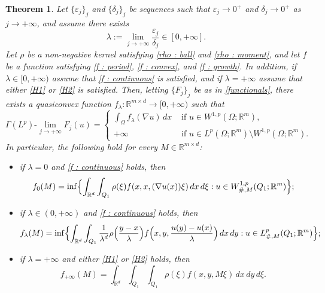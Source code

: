 \documentclass{article}
\newtheorem{theorem}[lemma]{Theorem}
\theoremstyle{definition}
\newcommand{\ej}{\varepsilon_j}
\newcommand{\dej}{\delta_j}
\newcommand{\R}{\mathbb{R}}
\begin{document}
\begin{theorem}\label{thm : main}
    Let $\{\ej\}_j$ and $\{\dej\}_j$ be sequences such that $\ej\to 0^+$ and $\dej\to0^+$ as $j\to+\infty$, and assume there exists
    \begin{equation*}
        \lambda:=\lim_{j\to+\infty}\frac{\ej}{\dej}\in[0,+\infty].
    \end{equation*} Let $\rho$ be a non-negative kernel satisfying \eqref{rho : ball} and \eqref{rho : moment}, and let $f$ be a function satisfying \eqref{f : period}, \eqref{f : convex}, and \eqref{f : growth}. In addition, if $\lambda\in[0,+\infty)$ assume that \eqref{f : continuous} is satisfied, and if $\lambda=+\infty$ assume that either \eqref{H1} or \eqref{H2} is satisfied. Then, letting $\{F_j\}_j$ be as in \eqref{functionals}, there exists a quasiconvex function $f_\lambda:\R^{m\times d}\to[0,+\infty)$ such that
    \begin{equation*}
        \Gamma(L^p)\text{-}\lim_{j\to+\infty} F_j(u) = \begin{cases}
            \displaystyle \int_{\Omega } f_\lambda(\nabla u)\,dx & \text{ if } u\in W^{1,p}(\Omega;\R^m), \\
            +\infty & \text{ if } u\in L^p(\Omega;\R^m)\setminus W^{1,p}(\Omega;\R^m).
        \end{cases}
    \end{equation*}
    In particular, the following hold for every $M\in\R^{m\times d}$:
    \begin{itemize}
        \item[(i)] if $\lambda=0$ and \eqref{f : continuous} holds, then
        \begin{equation*}
            f_0(M)= \inf\Bigl\{ \int_{\R^d} \int_{Q_1}\rho(\xi) f(x,x,(\nabla u(x) ) \xi)\, dx\,d\xi : u\in W^{1,p}_{\#,M}(Q_1; \R^m) \Bigr\};
        \end{equation*}
        \item[(ii)] if $\lambda\in(0,+\infty)$ and \eqref{f : continuous} holds, then 
         \begin{equation*}
            f_\lambda(M)= \inf\Bigl\{ \int_{\R^d}\int_{Q_1} \frac{1}{\lambda^d}\rho\Bigl(\frac{y-x}{\lambda}\Bigr) f\Bigl(x,y,\frac{u(y)-u(x)}{\lambda}\Bigr)\, dx\, dy : u\in L^p_{\#,M}(Q_1;\R^m) \Bigr\};
        \end{equation*}
        \item[(iii)] if $\lambda=+\infty$ and either \eqref{H1} or \eqref{H2} holds, then
        \begin{equation*}
            f_{+\infty}(M)=\int_{\R^d} \int_{Q_1}\int_{Q_1}\rho(\xi) f(x,y,M\xi)\, dx\, dy\,d\xi.
        \end{equation*}
    \end{itemize}
\end{theorem}
\end{document}
